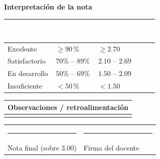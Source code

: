 \documentclass[10pt]{article}
\begin{document}
\vspace{6pt}

\noindent\textbf{\textcolor{uteqazul}{Interpretaci\'on de la nota}}\\[4pt]
\noindent\begin{tabularx}{\linewidth}{|L{0.32\linewidth}|C{0.28\linewidth}|>{\centering\arraybackslash}X|}
\hline
{}
\textcolor{white}{\textbf{Desempe\~no}} & \textcolor{white}{\textbf{\% del m\'aximo}} & \textcolor{white}{\textbf{Equivalente en escala 3.0}} \\
\hline
{}Excelente & $\geq 90\,\%$ & $\geq 2.70$ \\ \hline
{}Satisfactorio & $70\%$ -- $89\%$ & $2.10$ -- $2.69$ \\ \hline
{}En desarrollo & $50\%$ -- $69\%$ & $1.50$ -- $2.09$ \\ \hline
{}Insuficiente & $< 50\,\%$ & $< 1.50$ \\ \hline
\end{tabularx}

\vspace{10pt}

\noindent\begin{tabularx}{\linewidth}{|X|}
\hline
\cellcolor{filaazul}\textbf{Observaciones / retroalimentaci\'on} \\
\hline
\rule{0pt}{40pt} \\
\hline
\end{tabularx}

\vspace{18pt}
\noindent\begin{tabularx}{\linewidth}{C{0.5\linewidth}C{0.5\linewidth}}
\rule{6cm}{0.4pt} & \rule{6cm}{0.4pt} \\
Nota final (sobre 3.00) & Firma del docente \\
\end{tabularx}
\end{document}
